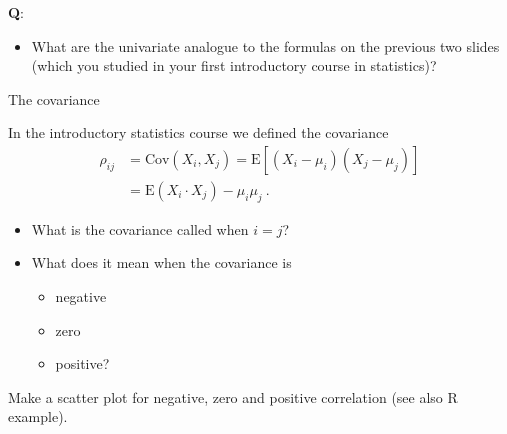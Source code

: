 \documentclass[ignorenonframetext,]{beamer}
\providecommand{\tightlist}{%
  \setlength{\itemsep}{0pt}\setlength{\parskip}{0pt}}
\begin{document}
\begin{frame}

\textbf{Q}:

\begin{itemize}
\tightlist
\item
  What are the univariate analogue to the formulas on the previous two
  slides (which you studied in your first introductory course in
  statistics)?
\end{itemize}

\vspace{80mm}

\end{frame}

\begin{frame}

\begin{block}{The covariance}

\vspace{2mm}

In the introductory statistics course we defined the covariance
\begin{align*}
\rho_{ij} & =\text{Cov}(X_i,X_j)  =\text{E}[(X_i-\mu_i)(X_j-\mu_j)] \\
& =\text{E}(X_i \cdot X_j)-\mu_i\mu_j \ . 
\end{align*}

\begin{itemize}
\tightlist
\item
  What is the covariance called when \(i=j\)?
\end{itemize}

\vspace{2mm}

\begin{itemize}
\tightlist
\item
  What does it mean when the covariance is

  \begin{itemize}
  \tightlist
  \item
    negative
  \item
    zero
  \item
    positive?
  \end{itemize}
\end{itemize}

\end{block}

\end{frame}

\begin{frame}

Make a scatter plot for negative, zero and positive correlation (see
also R example).

\vspace{6cm}

\end{frame}
\end{document}
